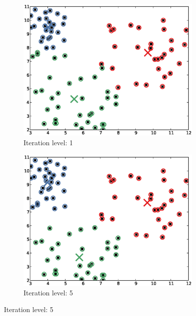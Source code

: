 \documentclass[a4paper,10pt,twoside]{article}
\begin{document}
\begin{figure}
  \centering
  \begin{subfigure}{.44\textwidth}
    \includegraphics[width=\textwidth,height=.5\textheight,keepaspectratio]{figure_1_1.eps}
    \caption{Iteration level: 1}
  \end{subfigure}
  \hspace*{\fill}
  \begin{subfigure}{.44\textwidth}
    \includegraphics[width=\textwidth,height=.5\textheight,keepaspectratio]{figure_1_2.eps}
    \caption{Iteration level: 5}
  \end{subfigure}


\end{figure}
\end{document}
